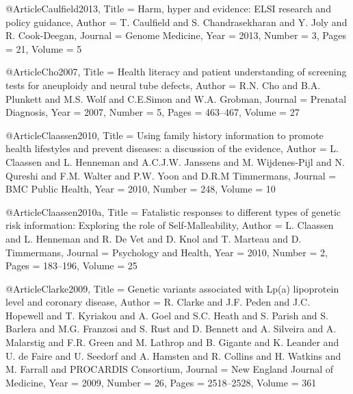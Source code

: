 @Article{Caulfield2013,
  Title                    = {Harm, hyper and evidence: ELSI research and policy guidance},
  Author                   = {T. Caulfield and S. Chandrasekharan and Y. Joly and R. Cook-Deegan},
  Journal                  = {Genome Medicine},
  Year                     = {2013},
  Number                   = {3},
  Pages                    = {21},
  Volume                   = {5}
}

@Article{Cho2007,
  Title                    = {Health literacy and patient understanding of screening tests for aneuploidy and neural tube defects},
  Author                   = {R.N. Cho and B.A. Plunkett and M.S. Wolf and C.E.Simon and W.A. Grobman},
  Journal                  = {Prenatal Diagnosis},
  Year                     = {2007},
  Number                   = {5},
  Pages                    = {463--467},
  Volume                   = {27}
}

@Article{Claassen2010,
  Title                    = {Using family history information to promote health lifestyles and prevent diseases: a discussion of the evidence},
  Author                   = {L. Claassen and L. Henneman and A.C.J.W. Janssens and M. Wijdenes-Pijl and N. Qureshi and F.M. Walter and P.W. Yoon and D.R.M Timmermans},
  Journal                  = {BMC Public Health},
  Year                     = {2010},
  Number                   = {248},
  Volume                   = {10}
}

@Article{Claassen2010a,
  Title                    = {Fatalistic responses to different types of genetic risk information: Exploring the role of Self-Malleability},
  Author                   = {L. Claassen and L. Henneman and R. De Vet and D. Knol and T. Marteau and D. Timmermans},
  Journal                  = {Psychology and Health},
  Year                     = {2010},
  Number                   = {2},
  Pages                    = {183--196},
  Volume                   = {25}
}

@Article{Clarke2009,
  Title                    = {Genetic variants associated with Lp(a) lipoprotein level and coronary disease},
  Author                   = {R. Clarke and J.F. Peden and J.C. Hopewell and T. Kyriakou and A. Goel and S.C. Heath and S. Parish and S. Barlera and M.G. Franzosi and S. Rust and D. Bennett and A. Silveira and A. Malarstig and F.R. Green and M. Lathrop and B. Gigante and K. Leander and U. de Faire and U. Seedorf and A. Hamsten and R. Collins and H. Watkins and M. Farrall and {PROCARDIS Consortium}},
  Journal                  = {New England Journal of Medicine},
  Year                     = {2009},
  Number                   = {26},
  Pages                    = {2518--2528},
  Volume                   = {361}
}

